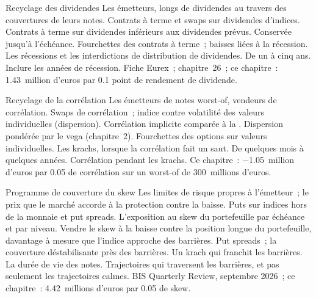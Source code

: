 \begin{strategyfile}{Recyclage des dividendes}\label{strat:s2:hedging-a-structured-products-book:dividends}
 Les émetteurs, longs de dividendes au travers des couvertures de leurs notes.
 Contrats à terme et swaps sur dividendes d'indices.
 Contrats à terme sur dividendes inférieurs aux dividendes prévus.
 Conservée jusqu'à l'échéance.
 Fourchettes des contrats à terme~; baisses liées à la récession.
 Les récessions et les interdictions de distribution de dividendes.
 De un à cinq ans.
 Inclure les années de récession.
 Fiche Eurex~; chapitre~26~; ce chapitre~: 1.43~million d'euros par 0.1 point de rendement de dividende.
\end{strategyfile}

\begin{strategyfile}{Recyclage de la corrélation}\label{strat:s2:hedging-a-structured-products-book:corr}
 Les émetteurs de notes worst-of, vendeurs de corrélation.
 Swaps de corrélation~; indice contre volatilité des valeurs individuelles (dispersion).
 Corrélation implicite comparée à la .
 Dispersion pondérée par le vega (chapitre~2).
 Fourchettes des options sur valeurs individuelles.
 Les krachs, lorsque la corrélation fait un saut.
 De quelques mois à quelques années.
 Corrélation pendant les krachs.
 Ce chapitre~: $-$1.05~million d'euros par 0.05 de corrélation sur un worst-of de 300~millions d'euros.
\end{strategyfile}

\begin{strategyfile}{Programme de couverture du skew}\label{strat:s2:hedging-a-structured-products-book:skew}
 Les limites de risque propres à l'émetteur~; le prix que le marché accorde à la protection contre la baisse.
 Puts sur indices hors de la monnaie et put spreads.
 L'exposition au skew du portefeuille par échéance et par niveau.
 Vendre le skew à la baisse contre la position longue du portefeuille, davantage à mesure que l'indice approche des barrières.
 Put spreads~; la couverture déstabilisante près des barrières.
 Un krach qui franchit les barrières.
 La durée de vie des notes.
 Trajectoires qui traversent les barrières, et pas seulement les trajectoires calmes.
 BIS Quarterly Review, septembre 2026~; ce chapitre~: 4.42~millions d'euros par 0.05 de skew.
\end{strategyfile}

